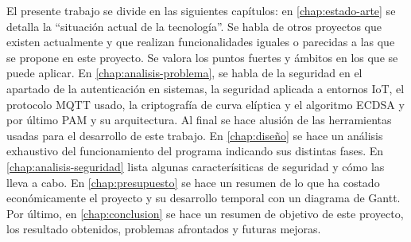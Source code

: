 El presente trabajo se divide en las siguientes capítulos: en \ref{chap:estado-arte} se detalla la ``situación actual de la 
tecnología''. Se habla de otros proyectos que existen actualmente y que realizan funcionalidades iguales o parecidas a las 
que se propone en este proyecto. Se valora los puntos fuertes y ámbitos en los que se puede aplicar. En \ref{chap:analisis-problema},
se habla de la seguridad en el apartado de la autenticación en sistemas, la seguridad aplicada a entornos IoT, el protocolo
MQTT usado, la criptografía de curva elíptica y el algoritmo ECDSA y por último PAM y su arquitectura. Al final se hace alusión
de las herramientas usadas para el desarrollo de este trabajo. En \ref{chap:diseño} se hace un análisis exhaustivo del 
funcionamiento del programa indicando sus distintas fases. En \ref{chap:analisis-seguridad} lista algunas caracterísiticas
de seguridad y cómo las lleva a cabo. En \ref{chap:presupuesto} se hace un resumen de lo que ha costado económicamente el 
proyecto y su desarrollo temporal con un diagrama de Gantt. Por último, en \ref{chap:conclusion} se hace un resumen de objetivo
de este proyecto, los resultado obtenidos, problemas afrontados y futuras mejoras.